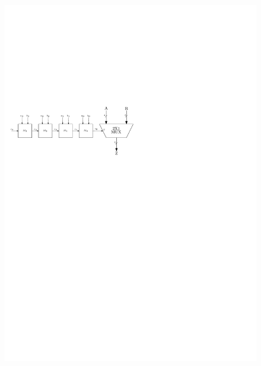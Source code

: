 \begin{enumerate}
	\begin{figure}[h]
		\centering
		\includegraphics[width=1\textwidth]{fig/Q_bonus_d.pdf}
		\label{fig:bonus_d}
	\end{figure}

\end{enumerate}




